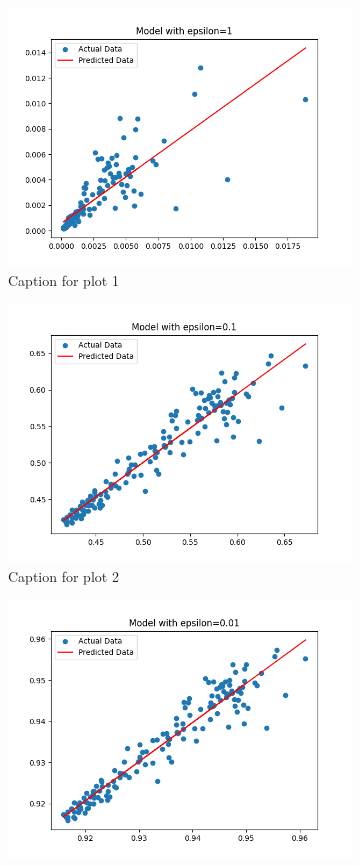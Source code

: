     \begin{figure}[h!]
        \centering
        \begin{subfigure}[b]{0.3\textwidth}
            \includegraphics[width=.8\linewidth]{plots/epsilon_1}
            \caption{Caption for plot 1}
        \end{subfigure} \quad
        \begin{subfigure}[b]{0.3\textwidth}
            \includegraphics[width=.8\linewidth]{plots/epsilon_0.1}
            \caption{Caption for plot 2}
        \end{subfigure} \quad
        \begin{subfigure}[b]{0.3\textwidth}
            \includegraphics[width=.8\linewidth]{plots/epsilon_0.01}

\end{subfigure}
\end{figure}
